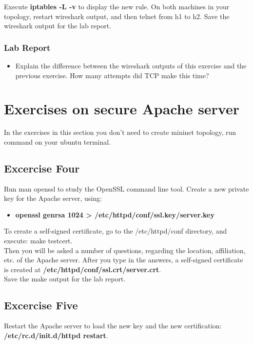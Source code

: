 \documentclass[10pt,a4paper]{article}
\numberwithin{equation}{section}
\numberwithin{figure}{section}
\numberwithin{table}{section}
\begin{document}
\setlength{\parindent}{0pt}
Execute \textbf{iptables -L -v} to display the new rule. On both machines in your topology, restart wireshark output, and then telnet from h1 to h2. Save the wireshark output for the lab report.

\subsubsection*{ Lab Report}
\begin{itemize}
	\setlength{\itemindent}{0pt}
	\item Explain the difference between the wireshark outputs of this exercise and the previous exercise. How many attempts did TCP make this time?
\end{itemize}

\pagebreak

\section{Exercises on secure Apache server}
In the exercises in this section you don't need to create mininet topology, run command on your ubuntu terminal.
\subsection*{Excercise Four}
Run man openssl to study the OpenSSL command line tool.
Create a new private key for the Apache server, using:

\begin{itemize}
	\setlength{\itemindent}{10pt}
	\item [] \textbf{openssl genrsa 1024 > /etc/httpd/conf/ssl.key/server.key} 
\end{itemize}

To create a self-signed certificate, go to the /etc/httpd/conf directory, and execute: make testcert. \\

Then you will be asked a number of questions, regarding the location, affiliation, etc. of the Apache server. After you type in the answers, a self-signed certificate is created at \textbf{/etc/httpd/conf/ssl.crt/server.crt}. \\

Save the make output for the lab report.

\subsection*{Excercise Five}
Restart the Apache server to load the new key and the new certification: \textbf{/etc/rc.d/init.d/httpd restart}.\\
\end{document}
